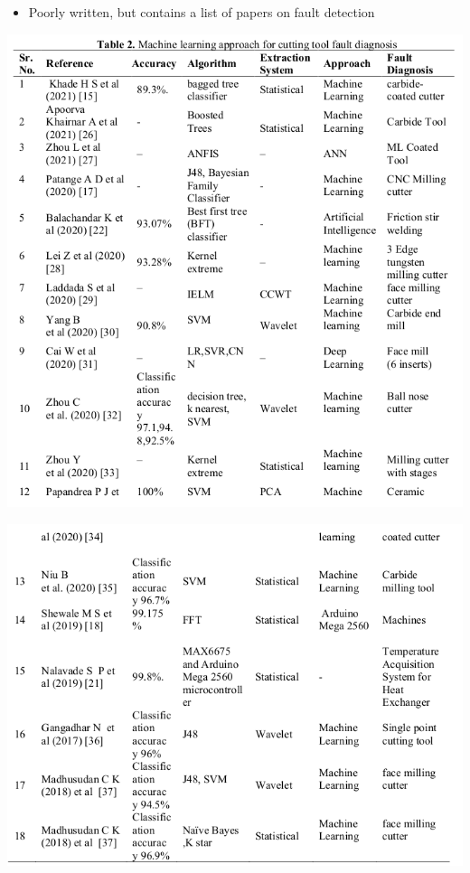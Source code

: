 \documentclass[
  letterpaper,
  DIV=11,
  numbers=noendperiod]{scrartcl}
\providecommand{\tightlist}{%
  \setlength{\itemsep}{0pt}\setlength{\parskip}{0pt}}\usepackage{longtable,booktabs,array}
\begin{document}
\begin{itemize}
\tightlist
\item
  Poorly written, but contains a list of papers on fault detection
\end{itemize}

\includegraphics{img/2023-01-07-12-19-30.png}

\includegraphics{img/2023-01-07-12-20-27.png}
\end{document}

